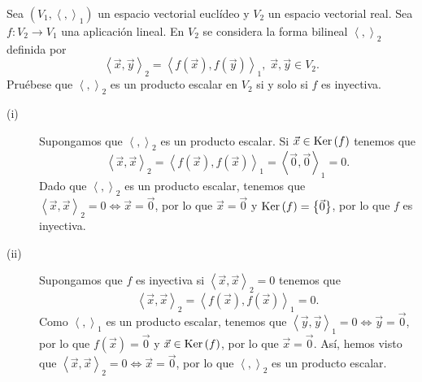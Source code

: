 \documentclass{article}
\begin{document}
\begin{ej}
Sea $\displaystyle \left(V_{1}, \left\langle ,  \right\rangle _{1}\right) $ un espacio vectorial euclídeo y $\displaystyle V_{2} $ un espacio vectorial real. Sea $\displaystyle f : V_{2} \to V_{1} $ una aplicación lineal. En $\displaystyle V_{2} $ se considera la forma bilineal $\displaystyle \left\langle ,  \right\rangle _{2} $ definida por 
\[\left\langle \vec{x}, \vec{y} \right\rangle _{2} = \left\langle f\left(\vec{x}\right), f\left(\vec{y}\right) \right\rangle _{1}, \; \vec{x}, \vec{y} \in V_{2} .\]
Pruébese que $\displaystyle \left\langle ,  \right\rangle _{2} $ es un producto escalar en $\displaystyle V_{2} $ si y solo si $\displaystyle f $ es inyectiva.
\end{ej}
\begin{sol}
\begin{description}
\item[(i)] Supongamos que $\displaystyle \left\langle ,  \right\rangle _{2} $ es un producto escalar. Si $\displaystyle \vec{x} \in \operatorname{Ker}\left(f\right) $ tenemos que 
	\[\left\langle \vec{x}, \vec{x} \right\rangle _{2} = \left\langle f\left(\vec{x}\right), f\left(\vec{x}\right) \right\rangle _{1} = \left\langle \vec{0}, \vec{0} \right\rangle _{1} = 0 .\]
	Dado que $\displaystyle \left\langle ,  \right\rangle _{2} $ es un producto escalar, tenemos que $\displaystyle \left\langle \vec{x}, \vec{x} \right\rangle _{2} = 0 \iff \vec{x} = \vec{0} $, por lo que $\displaystyle \vec{x} = \vec{0} $ y $\displaystyle \operatorname{Ker}\left(f\right) = \left\{ \vec{0}\right\}  $, por lo que $\displaystyle f $ es inyectiva.
\item[(ii)] Supongamos que $\displaystyle f $ es inyectiva si $\displaystyle \left\langle \vec{x}, \vec{x} \right\rangle _{2} = 0 $ tenemos que 
	\[\left\langle \vec{x}, \vec{x} \right\rangle _{2} = \left\langle f\left(\vec{x}\right), f\left(\vec{x}\right) \right\rangle _{1} = 0 .\]
	Como $\displaystyle \left\langle ,  \right\rangle _{1} $ es un producto escalar, tenemos que $\displaystyle \left\langle \vec{y}, \vec{y} \right\rangle _{1} = 0 \iff \vec{y} = \vec{0} $, por lo que $\displaystyle f\left(\vec{x}\right) = \vec{0} $ y $\displaystyle \vec{x} \in \operatorname{Ker}\left(f\right) $, por lo que $\displaystyle \vec{x} = \vec{0} $. Así, hemos visto que $\displaystyle \left\langle \vec{x}, \vec{x} \right\rangle _{2} = 0 \iff \vec{x} = \vec{0} $, por lo que $\displaystyle \left\langle ,  \right\rangle _{2} $ es un producto escalar.
\end{description}
\end{sol}
\end{document}
